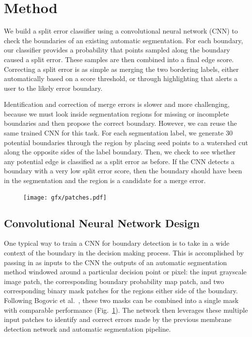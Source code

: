 \section{Method}
We build a split error classifier using a convolutional neural network (CNN) to check the boundaries of an existing automatic segmentation. For each boundary, our classifier provides a probability that points sampled along the boundary caused a split error. These samples are then combined into a final edge score. Correcting a split error is as simple as merging the two bordering labels, either automatically based on a score threshold, or through highlighting that alerts a user to the likely error boundary.

Identification and correction of merge errors is slower and more challenging, because we must look inside segmentation regions for missing or incomplete boundaries and then propose the correct boundary. However, we can reuse the same trained CNN for this task. For each segmentation label, we generate 30 potential boundaries through the region by placing seed points to a watershed cut along the opposite sides of the label boundary. Then, we check to see whether any potential edge is classified as a split error as before. If the CNN detects a boundary with a very low split error score, then the boundary should have been in the segmentation and the region is a candidate for a merge error.

\begin{figure}[t]
\centering
\texttt{[image: gfx/patches.pdf]}
\caption{}
\label{fig:patches}
\end{figure}


\subsection{Convolutional Neural Network Design}
One typical way to train a CNN for boundary detection is to take in a wide context of the boundary in the decision making process. This is accomplished by passing in as inputs to the CNN the outputs of an automatic segmentation method windowed around a particular decision point or pixel: the input grayscale image patch, the corresponding boundary probability map patch, and two corresponding binary mask patches for the regions either side of the boundary. Following Bogovic et al.~\cite{BogovicHJ13}, these two masks can be combined into a single mask with comparable performance (Fig.~\ref{fig:patches}). The network then leverages these multiple input patches to identify and correct errors made by the previous membrane detection network and automatic segmentation pipeline.

